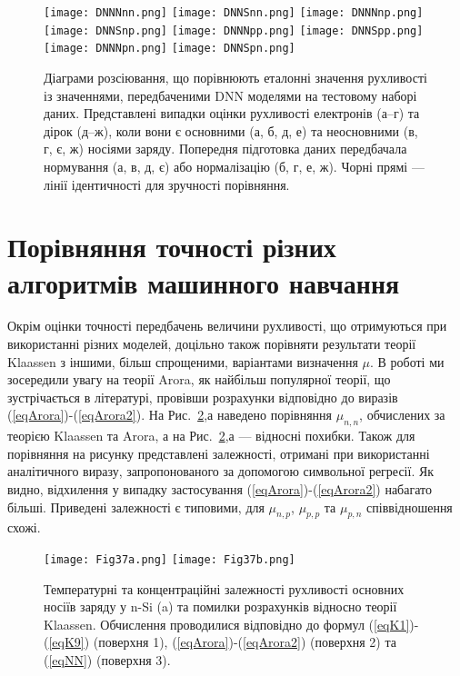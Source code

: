 \documentclass[14pt,a4paper,titlepage,oneside]{book}
\numberwithin{equation}{part}
\begin{document}
\begin{figure}
	\centering
     \texttt{[image: DNNNnn.png]}\kern 20pt
     \texttt{[image: DNNSnn.png]}
     \texttt{[image: DNNNnp.png]}\kern 20pt
     \texttt{[image: DNNSnp.png]}
     \texttt{[image: DNNNpp.png]}\kern 20pt
     \texttt{[image: DNNSpp.png]}
     \texttt{[image: DNNNpn.png]}\kern 20pt
     \texttt{[image: DNNSpn.png]}
	  \caption{Діаграми розсіювання, що порівнюють еталонні значення рухливості із значеннями, передбаченими DNN моделями
       на тестовому наборі даних.
       Представлені випадки оцінки рухливості електронів (а--г) та дірок (д--ж), коли вони є
       основними (а, б, д, е) та неосновними (в, г, є, ж) носіями заряду.
       Попередня підготовка даних передбачала нормування (а, в, д, є) або нормалізацію (б, г, е, ж).
       Чорні прямі --- лінії ідентичності для зручності порівняння.
}\label{figDNN}
\end{figure}



\section{Порівняння точності різних алгоритмів машинного навчання}

Окрім оцінки точності передбачень величини рухливості, що отримуються при використанні різних моделей,
доцільно також порівняти результати теорії Klaassen з іншими, більш спрощеними, варіантами визначення $\mu$.
В роботі ми зосередили увагу на теорії Arora, як найбільш популярної теорії, що зустрічається в літературі,
провівши розрахунки відповідно до виразів (\ref{eqArora})-(\ref{eqArora2}).
На Рис.~\ref{figLast},а наведено порівняння $\mu_{n,n}$, обчислених за теорією  Klaassen та Arora,
а на Рис.~\ref{figLast},а --- відносні похибки.
Також для порівняння на рисунку представлені залежності, отримані при використанні
аналітичного виразу, запропонованого за допомогою символьної регресії.
Як видно, відхилення у випадку застосування (\ref{eqArora})-(\ref{eqArora2}) набагато більші.
Приведені залежності є типовими, для $\mu_{n,p}$, $\mu_{p,p}$ та $\mu_{p,n}$ співвідношення схожі.

\begin{figure}
	\centering
     \texttt{[image: Fig37a.png]}\kern 20pt
     \texttt{[image: Fig37b.png]}
	  \caption{Температурні та концентраційні залежності рухливості основних носіїв заряду у n-Si (a)
       та помилки розрахунків відносно теорії Klaassen.
       Обчислення проводилися відповідно до формул (\ref{eqK1})-(\ref{eqK9}) (поверхня 1),
       (\ref{eqArora})-(\ref{eqArora2}) (поверхня 2)  та (\ref{eqNN}) (поверхня 3).
}\label{figLast}
\end{figure}
\end{document}
